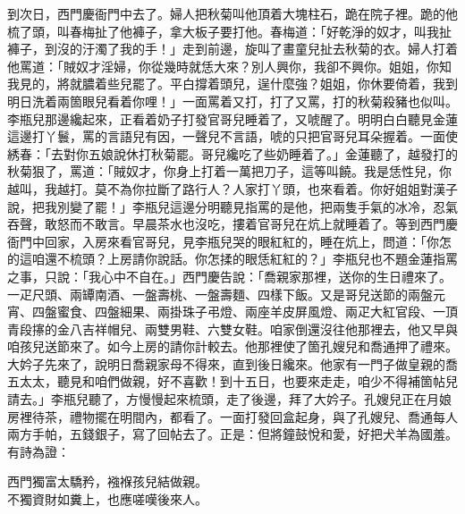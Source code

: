 到次日，西門慶衙門中去了。婦人把秋菊叫他頂着大塊柱石，跪在院子裡。跪的他梳了頭，叫春梅扯了他褲子，拿大板子要打他。春梅道：「好乾淨的奴才，叫我扯褲子，到沒的汙濁了我的手！」走到前邊，旋叫了畫童兒扯去秋菊的衣。婦人打着他罵道：「賊奴才淫婦，你從幾時就恁大來？別人興你，我卻不興你。姐姐，你知我見的，將就膿着些兒罷了。平白撐着頭兒，逞什麼強？姐姐，你休要倚着，我到明日洗着兩箇眼兒看着你哩！」{}一面罵着又打，打了又罵，打的秋菊殺豬也似叫。李瓶兒那邊纔起來，正看着奶子打發官哥兒睡着了，又唬醒了。明明白白聽見金蓮這邊打丫鬟，罵的言語兒有因，一聲兒不言語，唬的只把官哥兒耳朵握着。一面使綉春：「去對你五娘說休打秋菊罷。哥兒纔吃了些奶睡着了。」金蓮聽了，越發打的秋菊狠了，罵道：「賊奴才，你身上打着一萬把刀子，這等叫饒。我是恁性兒，你越叫，我越打。{}莫不為你拉斷了路行人？人家打丫頭，也來看着。你好姐姐對漢子說，把我別變了罷！」李瓶兒這邊分明聽見指罵的是他，把兩隻手氣的冰冷，忍氣吞聲，敢怒而不敢言。早晨茶水也沒吃，摟着官哥兒在炕上就睡着了。等到西門慶衙門中回家，入房來看官哥兒，見李瓶兒哭的眼紅紅的，睡在炕上，問道：「你怎的這咱還不梳頭？上房請你說話。你怎揉的眼恁紅紅的？」李瓶兒也不題金蓮指罵之事，只說：「我心中不自在。」西門慶告說：「喬親家那裡，送你的生日禮來了。一疋尺頭、兩罈南酒、一盤壽桃、一盤壽麵、四樣下飯。又是哥兒送節的兩盤元宵、四盤蜜食、四盤細果、兩掛珠子弔燈、兩座羊皮屏風燈、兩疋大紅官段、一頂青段㩟的金八吉祥帽兒、兩雙男鞋、六雙女鞋。咱家倒還沒往他那裡去，他又早與咱孩兒送節來了。如今上房的請你計較去。他那裡使了箇孔嫂兒和喬通押了禮來。大妗子先來了，說明日喬親家母不得來，直到後日纔來。他家有一門子做皇親的喬五太太，聽見和咱們做親，好不喜歡！到十五日，也要來走走，咱少不得補箇帖兒請去。」李瓶兒聽了，方慢慢起來梳頭，走了後邊，拜了大妗子。孔嫂兒正在月娘房裡待茶，禮物擺在明間內，都看了。一面打發回盒起身，與了孔嫂兒、喬通每人兩方手帕，五錢銀子，寫了回帖去了。正是：但將鐘鼓悅和愛，好把犬羊為國羞。有詩為證：

\begin{myquote}
西門獨富太驕矜，襁褓孩兒結做親。\\不獨資財如糞上，也應嗟嘆後來人。
\end{myquote}
